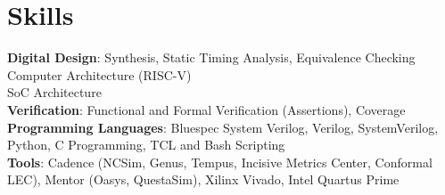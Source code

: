\section{\sc Skills}
{\bf{Digital Design}}: Synthesis, Static Timing Analysis, Equivalence Checking \\
Computer Architecture (RISC-V) \\
SoC Architecture \\
{\bf{Verification}}: Functional and Formal Verification (Assertions), Coverage \\
{\bf{Programming Languages}}: Bluespec System Verilog, Verilog, SystemVerilog, Python, C Programming, TCL and Bash Scripting \\
{\bf{Tools}}: Cadence (NCSim, Genus, Tempus, Incisive Metrics Center, Conformal LEC), 
Mentor (Oasys, QuestaSim), Xilinx Vivado, Intel Quartus Prime

\endinput